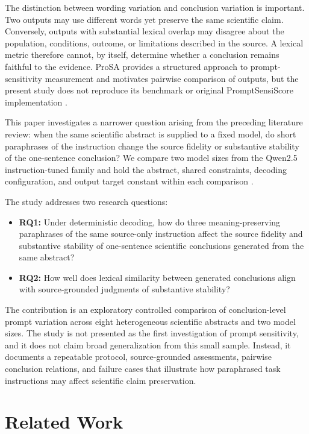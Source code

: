 \documentclass[acmsmall,screen,nonacm]{acmart}
\begin{document}
The distinction between wording variation and conclusion variation is important. Two outputs may use different words yet preserve the same scientific claim. Conversely, outputs with substantial lexical overlap may disagree about the population, conditions, outcome, or limitations described in the source. A lexical metric therefore cannot, by itself, determine whether a conclusion remains faithful to the evidence. ProSA provides a structured approach to prompt-sensitivity measurement and motivates pairwise comparison of outputs, but the present study does not reproduce its benchmark or original PromptSensiScore implementation \cite{zhuo2024}.

This paper investigates a narrower question arising from the preceding literature review: when the same scientific abstract is supplied to a fixed model, do short paraphrases of the instruction change the source fidelity or substantive stability of the one-sentence conclusion? We compare two model sizes from the Qwen2.5 instruction-tuned family and hold the abstract, shared constraints, decoding configuration, and output target constant within each comparison \cite{qwen2024}.

The study addresses two research questions:
\begin{itemize}[leftmargin=*]
  \item \textbf{RQ1:} Under deterministic decoding, how do three meaning-preserving paraphrases of the same source-only instruction affect the source fidelity and substantive stability of one-sentence scientific conclusions generated from the same abstract?
  \item \textbf{RQ2:} How well does lexical similarity between generated conclusions align with source-grounded judgments of substantive stability?
\end{itemize}

The contribution is an exploratory controlled comparison of conclusion-level prompt variation across eight heterogeneous scientific abstracts and two model sizes. The study is not presented as the first investigation of prompt sensitivity, and it does not claim broad generalization from this small sample. Instead, it documents a repeatable protocol, source-grounded assessments, pairwise conclusion relations, and failure cases that illustrate how paraphrased task instructions may affect scientific claim preservation.

\section{Related Work}
\end{document}
